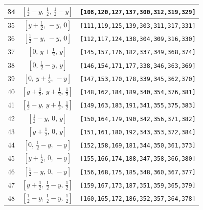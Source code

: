 \documentclass[fleqn,8pt]{jsarticle}
\begin{document}
\begin{longtable}{ccc}
34 & $\left[ \frac{1}{2} - y,\, \frac{1}{2},\, \frac{1}{2} - y \right]$ & {\tt [108,120,127,137,300,312,319,329]} \\ \hline
35 & $\left[ y + \frac{1}{2},\, - y,\, 0 \right]$ & {\tt [111,119,125,139,303,311,317,331]} \\ \hline
36 & $\left[ \frac{1}{2} - y,\, - y,\, 0 \right]$ & {\tt [112,117,124,138,304,309,316,330]} \\ \hline
37 & $\left[ 0,\, y + \frac{1}{2},\, y \right]$ & {\tt [145,157,176,182,337,349,368,374]} \\ \hline
38 & $\left[ 0,\, \frac{1}{2} - y,\, y \right]$ & {\tt [146,154,171,177,338,346,363,369]} \\ \hline
39 & $\left[ 0,\, y + \frac{1}{2},\, - y \right]$ & {\tt [147,153,170,178,339,345,362,370]} \\ \hline
40 & $\left[ y + \frac{1}{2},\, y + \frac{1}{2},\, \frac{1}{2} \right]$ & {\tt [148,162,184,189,340,354,376,381]} \\ \hline
41 & $\left[ \frac{1}{2} - y,\, y + \frac{1}{2},\, \frac{1}{2} \right]$ & {\tt [149,163,183,191,341,355,375,383]} \\ \hline
42 & $\left[ \frac{1}{2} - y,\, 0,\, y \right]$ & {\tt [150,164,179,190,342,356,371,382]} \\ \hline
43 & $\left[ y + \frac{1}{2},\, 0,\, y \right]$ & {\tt [151,161,180,192,343,353,372,384]} \\ \hline
44 & $\left[ 0,\, \frac{1}{2} - y,\, - y \right]$ & {\tt [152,158,169,181,344,350,361,373]} \\ \hline
45 & $\left[ y + \frac{1}{2},\, 0,\, - y \right]$ & {\tt [155,166,174,188,347,358,366,380]} \\ \hline
46 & $\left[ \frac{1}{2} - y,\, 0,\, - y \right]$ & {\tt [156,168,175,185,348,360,367,377]} \\ \hline
47 & $\left[ y + \frac{1}{2},\, \frac{1}{2} - y,\, \frac{1}{2} \right]$ & {\tt [159,167,173,187,351,359,365,379]} \\ \hline
48 & $\left[ \frac{1}{2} - y,\, \frac{1}{2} - y,\, \frac{1}{2} \right]$ & {\tt [160,165,172,186,352,357,364,378]} \\
\end{longtable}
\renewcommand{\arraystretch}{1.2}
\end{document}
